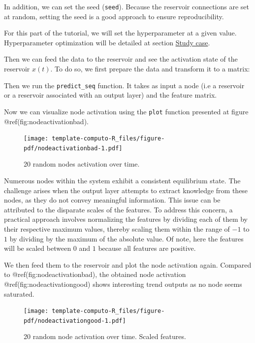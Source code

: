\documentclass[
  11pt,
  a4paper,
]{article}
\theoremstyle{plain}
\theoremstyle{remark}
\begin{document}
In addition, we can set the seed (\texttt{seed}). Because the reservoir
connections are set at random, setting the seed is a good approach to
ensure reproducibility.

For this part of the tutorial, we will set the hyperparameter at a given
value. Hyperparameter optimization will be detailed at section
\hyperref[studycase]{Study case}.

Then we can feed the data to the reservoir and see the activation state
of the reservoir \(x(t)\). To do so, we first prepare the data and
transform it to a matrix:

Then we run the \texttt{predict\_seq} function. It takes as input a node
(i.e a reservoir or a reservoir associated with an output layer) and the
feature matrix.

Now we can visualize node activation using the \texttt{plot} function
presented at figure @ref(fig:nodeactivationbad).

\begin{figure}[H]

{\centering \texttt{[image: template-computo-R\_files/figure-pdf/nodeactivationbad-1.pdf]}

}

\caption{20 random nodes activation over time.}

\end{figure}%

Numerous nodes within the system exhibit a consistent equilibrium state.
The challenge arises when the output layer attempts to extract knowledge
from these nodes, as they do not convey meaningful information. This
issue can be attributed to the disparate scales of the features. To
address this concern, a practical approach involves normalizing the
features by dividing each of them by their respective maximum values,
thereby scaling them within the range of \(-1\) to \(1\) by dividing by
the maximum of the absolute value. Of note, here the features will be
scaled between \(0\) and \(1\) because all features are positive.

We then feed them to the reservoir and plot the node activation again.
Compared to @ref(fig:nodeactivationbad), the obtained node activation
@ref(fig:nodeactivationgood) shows interesting trend outputs as no node
seems saturated.

\begin{figure}[H]

{\centering \texttt{[image: template-computo-R\_files/figure-pdf/nodeactivationgood-1.pdf]}

}

\caption{20 random node activation over time. Scaled features.}

\end{figure}%
\end{document}
